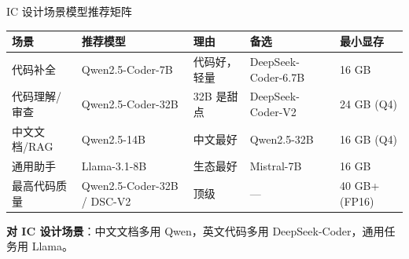 \documentclass[UTF8,11pt,aspectratio=169]{beamer}
\begin{document}
\begin{frame}{IC 设计场景模型推荐矩阵}
  \begin{table}
    \centering
    \small
    \begin{tabular}{p{2.6cm}p{3.8cm}p{2.5cm}p{2.2cm}p{2.5cm}}
      \toprule
      \textbf{场景}       & \textbf{推荐模型}             & \textbf{理由}           & \textbf{备选}                & \textbf{最小显存} \\
      \midrule
      代码补全             & Qwen2.5-Coder-7B             & 代码好，轻量            & DeepSeek-Coder-6.7B         & 16 GB            \\
      代码理解/审查        & Qwen2.5-Coder-32B            & 32B 是甜点              & DeepSeek-Coder-V2           & 24 GB (Q4)       \\
      中文文档/RAG         & Qwen2.5-14B                  & 中文最好                & Qwen2.5-32B                 & 16 GB (Q4)       \\
      通用助手             & Llama-3.1-8B                 & 生态最好                & Mistral-7B                  & 16 GB            \\
      最高代码质量         & Qwen2.5-Coder-32B / DSC-V2   & 顶级                    & ---                           & 40 GB+ (FP16)     \\
      \bottomrule
    \end{tabular}
  \end{table}

  \vspace{0.5em}
  \textbf{对 IC 设计场景}：中文文档多用 Qwen，英文代码多用 DeepSeek-Coder，通用任务用 Llama。
\end{frame}
\end{document}
